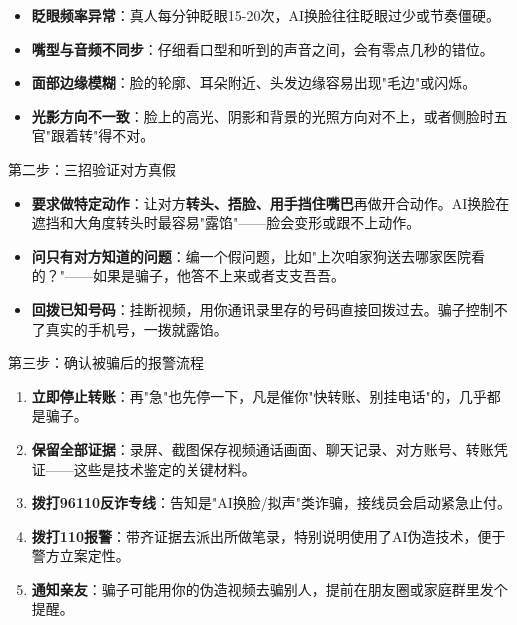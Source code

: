 \begin{itemize}
  \item \textbf{眨眼频率异常}：真人每分钟眨眼15-20次，AI换脸往往眨眼过少或节奏僵硬。
  \item \textbf{嘴型与音频不同步}：仔细看口型和听到的声音之间，会有零点几秒的错位。
  \item \textbf{面部边缘模糊}：脸的轮廓、耳朵附近、头发边缘容易出现"毛边"或闪烁。
  \item \textbf{光影方向不一致}：脸上的高光、阴影和背景的光照方向对不上，或者侧脸时五官"跟着转"得不对。
\end{itemize}

\begin{tcbinfo}{第二步：三招验证对方真假}
\begin{itemize}
  \item \textbf{要求做特定动作}：让对方\textbf{转头、捂脸、用手挡住嘴巴}再做开合动作。AI换脸在遮挡和大角度转头时最容易"露馅"——脸会变形或跟不上动作。
  \item \textbf{问只有对方知道的问题}：编一个假问题，比如"上次咱家狗送去哪家医院看的？"——如果是骗子，他答不上来或者支支吾吾。
  \item \textbf{回拨已知号码}：挂断视频，用你通讯录里存的号码直接回拨过去。骗子控制不了真实的手机号，一拨就露馅。
\end{itemize}

\end{tcbinfo}

\begin{tcbwarn}{第三步：确认被骗后的报警流程}
\begin{enumerate}
  \item \textbf{立即停止转账}：再"急"也先停一下，凡是催你"快转账、别挂电话"的，几乎都是骗子。
  \item \textbf{保留全部证据}：录屏、截图保存视频通话画面、聊天记录、对方账号、转账凭证——这些是技术鉴定的关键材料。
  \item \textbf{拨打96110反诈专线}：告知是"AI换脸/拟声"类诈骗，接线员会启动紧急止付。
  \item \textbf{拨打110报警}：带齐证据去派出所做笔录，特别说明使用了AI伪造技术，便于警方立案定性。
  \item \textbf{通知亲友}：骗子可能用你的伪造视频去骗别人，提前在朋友圈或家庭群里发个提醒。
\end{enumerate}

\end{tcbwarn}


